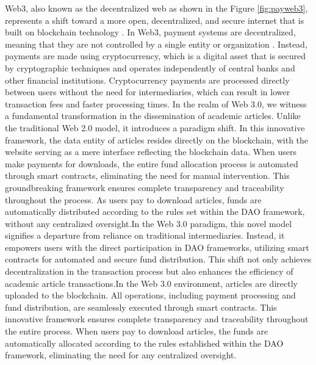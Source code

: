 \documentclass[lettersize,journal]{IEEEtran}
\begin{document}
Web3, also known as the decentralized web as shown in the Figure \ref{fig:payweb3}, represents a shift toward a more open, decentralized, and secure internet that is built on blockchain technology \cite{alabdulwahhab2018web}. In Web3, payment systems are decentralized, meaning that they are not controlled by a single entity or organization \cite{cao2022decentralized}. Instead, payments are made using cryptocurrency, which is a digital asset that is secured by cryptographic techniques and operates independently of central banks and other financial institutions. Cryptocurrency payments are processed directly between users without the need for intermediaries, which can result in lower transaction fees and faster processing times.
In the realm of Web 3.0, we witness a fundamental transformation in the dissemination of academic articles. Unlike the traditional Web 2.0 model, it introduces a paradigm shift. In this innovative framework, the data entity of articles resides directly on the blockchain, with the website serving as a mere interface reflecting the blockchain data. When users make payments for downloads, the entire fund allocation process is automated through smart contracts, eliminating the need for manual intervention. This groundbreaking framework ensures complete transparency and traceability throughout the process. As users pay to download articles, funds are automatically distributed according to the rules set within the DAO framework, without any centralized oversight.In the Web 3.0 paradigm, this novel model signifies a departure from reliance on traditional intermediaries. Instead, it empowers users with the direct participation in DAO frameworks, utilizing smart contracts for automated and secure fund distribution. This shift not only achieves decentralization in the transaction process but also enhances the efficiency of academic article transactions.In the Web 3.0 environment, articles are directly uploaded to the blockchain. All operations, including payment processing and fund distribution, are seamlessly executed through smart contracts. This innovative framework ensures complete transparency and traceability throughout the entire process. When users pay to download articles, the funds are automatically allocated according to the rules established within the DAO framework, eliminating the need for any centralized oversight.
\end{document}
